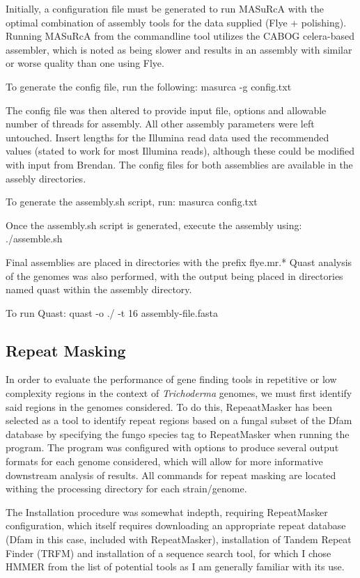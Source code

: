 \documentclass[12pt]{article}
\begin{document}
Initially, a configuration file must be generated to run MASuRcA with
the optimal combination of assembly tools for the data supplied (Flye
+ polishing). Running MASuRcA from the commandline tool utilizes the
CABOG celera-based assembler, which is noted as being slower and
results in an assembly with similar or worse quality than one using
Flye.

To generate the config file, run the following:
masurca -g config.txt

The config file was then altered to provide input file, options and
allowable number of threads for assembly. All other assembly
parameters were left untouched. Insert lengths for the Illumina read
data used the recommended values (stated to work for most Illumina
reads), although these could be modified with input from Brendan. The
config files for both assemblies are available in the assebly
directories.

To generate the assembly.sh script, run:
masurca config.txt

Once the assembly.sh script is generated, execute the assembly using:
./assemble.sh

Final assemblies are placed in directories with the prefix flye.mr.*
Quast analysis of the genomes was also performed, with the output
being placed in directories named quast within the assembly directory.

To run Quast:
quast -o ./ -t 16 assembly-file.fasta

\subsection{Repeat Masking}

In order to evaluate the performance of gene finding tools in
repetitive or low complexity regions in the context of
\textit{Trichoderma} genomes, we must first identify said regions in
the genomes considered. To do this, RepeaatMasker has been selected as
a tool to identify repeat regions based on a fungal subset of the Dfam
database by specifying the fungo species tag to RepeatMasker when
running the program. The program was configured with options to
produce several output formats for each genome considered, which will
allow for more informative downstream analysis of results. All
commands for repeat masking are located withing the processing
directory for each strain/genome.

The Installation procedure was somewhat indepth, requiring
RepeatMasker configuration, which itself requires downloading an
appropriate repeat database (Dfam in this case, included with
RepeatMasker), installation of Tandem Repeat Finder (TRFM) and
installation of a sequence search tool, for which I chose HMMER from
the list of potential tools as I am generally familiar with its use.
\end{document}
